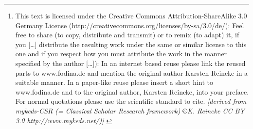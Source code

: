 %
%
%
%
%

\author{Karsten Reincke\footnote{This text is licensed under the Creative
Commons Attribution-ShareAlike 3.0 Germany License
(http://creativecommons.org/licenses/by-sa/3.0/de/): Feel free \glqq{}to share
(to copy, distribute and transmit)\grqq{} or \glqq{}to remix (to adapt)\grqq{}
it, if you \glqq{}[\ldots] distribute the resulting work under the same or
similar license to this one\grqq{} and if you respect how \glqq{}you must
attribute the work in the manner specified by the author [\ldots]\grqq{}):
\newline
In an internet based reuse please link the reused parts to www.fodina.de and
mention the original author Karsten Reincke in a suitable manner. In a
paper-like reuse please insert a short hint to www.fodina.de and to the original
author, Karsten Reincke, into your preface. For normal quotations please use the
scientific standard to cite.
\newline
{ \tiny \itshape [derived from mykeds-CSR (= Classical Scholar
Research framework) \copyright K. Reincke CC BY 3.0 http://www.mykeds.net/)] }
}}

